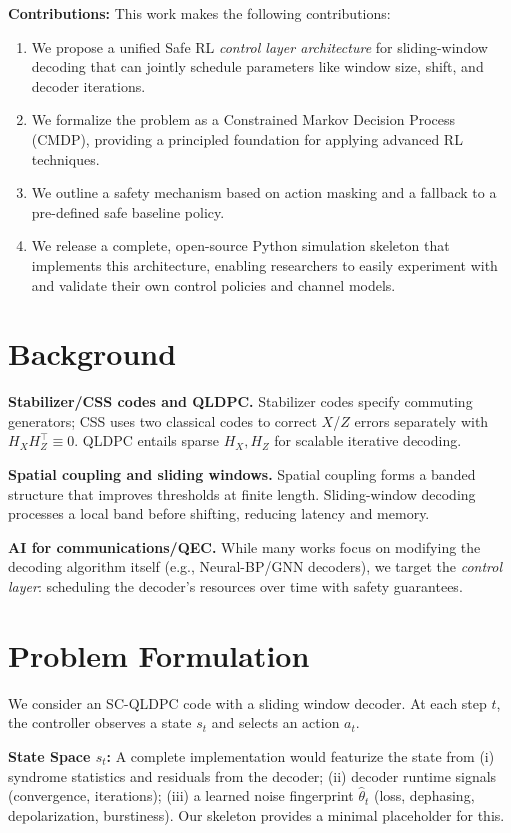 \documentclass[conference]{IEEEtran}
\begin{document}
\textbf{Contributions:}
This work makes the following contributions:
\begin{enumerate}
    \item We propose a unified Safe RL \emph{control layer architecture} for sliding-window decoding that can jointly schedule parameters like window size, shift, and decoder iterations.
    \item We formalize the problem as a Constrained Markov Decision Process (CMDP), providing a principled foundation for applying advanced RL techniques.
    \item We outline a safety mechanism based on action masking and a fallback to a pre-defined safe baseline policy.
    \item We release a complete, open-source Python simulation skeleton that implements this architecture, enabling researchers to easily experiment with and validate their own control policies and channel models.
\end{enumerate}

\section{Background}
\textbf{Stabilizer/CSS codes and QLDPC.} Stabilizer codes specify commuting generators; CSS uses two classical codes to correct $X$/$Z$ errors separately with $H_X H_Z^\top \equiv 0$. QLDPC entails sparse $H_X,H_Z$ for scalable iterative decoding.

\textbf{Spatial coupling and sliding windows.} Spatial coupling forms a banded structure that improves thresholds at finite length. Sliding-window decoding processes a local band before shifting, reducing latency and memory.

\textbf{AI for communications/QEC.} While many works focus on modifying the decoding algorithm itself (e.g., Neural-BP/GNN decoders), we target the \emph{control layer}: scheduling the decoder's resources over time with safety guarantees.

\section{Problem Formulation}
We consider an SC-QLDPC code with a sliding window decoder. At each step $t$, the controller observes a state $s_t$ and selects an action $a_t$.

\textbf{State Space $s_t$:} A complete implementation would featurize the state from (i) syndrome statistics and residuals from the decoder; (ii) decoder runtime signals (convergence, iterations); (iii) a learned noise fingerprint $\hat{\theta}_t$ (loss, dephasing, depolarization, burstiness). Our skeleton provides a minimal placeholder for this.
\end{document}
